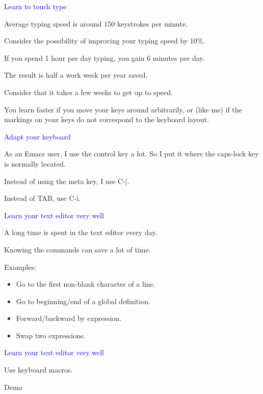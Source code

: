 \documentclass{slides}
\newcommand{\ti}[1]{\begin{center}\Large{\textcolor{blue}{#1}}\end{center}}
\begin{document}
\begin{slide}\ti{Learn to touch type}

Average typing speed is around 150 keystrokes per minute.

Consider the possibility of improving your typing speed by 10\%. 

If you spend 1 hour per day typing, you gain 6 minutes per day.

The result is half a work week per year saved.

Consider that it takes a few weeks to get up to speed.

You learn faster if you move your keys around arbitrarily, or (like
me) if the markings on your keys do not correspond to the keyboard
layout.

\vfill\end{slide}
\begin{slide}\ti{Adapt your keyboard}

As an Emacs user, I use the control key a lot.  So I put it where the
caps-lock key is normally located.  

Instead of using the meta key, I use C-[.

Instead of TAB, use C-i.

\vfill\end{slide}
\begin{slide}\ti{Learn your text editor very well}

A long time is spent in the text editor every day.

Knowing the commands can save a lot of time.

Examples:

\begin{itemize}
\item Go to the first non-blank character of a line.
\item Go to beginning/end of a global definition.
\item Forward/backward by expression.
\item Swap two expressions.
\end{itemize}

\vfill\end{slide}
\begin{slide}\ti{Learn your text editor very well}

Use keyboard macros.

Demo

\vfill\end{slide}
\end{document}
